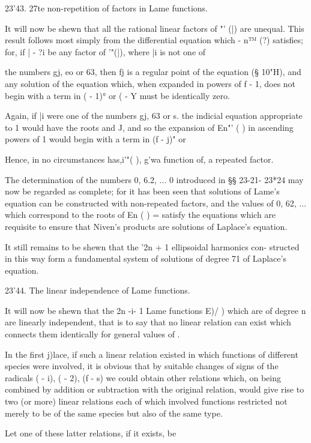 {{{{{{{23'43. 27te non-repetition of factors in Lame functions.

It will now be shewn that all the rational linear factors of "' (|)
are unequal. This result follows most simply from the differential
equation which - n™ (?) satisfies; for, if | - ?i be any factor of
'"(|), where |i is not one of

%
%

the numbers gj, eo or 63, then fj is a regular point of the equation
(§ 10"H), and any solution of the equation which, when expanded in
powers of f - 1, does not begin with a term in ( - 1)° or ( - Y must
be identically zero.

Again, if |i were one of the numbers gj, 63 or s. the indicial
equation appropriate to 1 would have the roots and J, and so the
expansion of En"' ( ) in ascending powers of 1 would begin with a term
in (f - j)" or

Hence, in no circumstances has,i'"( ), g'wa function of, a repeated
factor.

The determination of the numbers 0, 6.2, ... 0 introduced in §§
23-21- 23*24 may now be regarded as complete; for it has been seen
that solutions of Lame's equation can be constructed with non-repeated
factors, and the values of 0, 62, ... which correspond to the roots
of En ( ) = satisfy the equations which are requisite to ensure that
Niven's products are solutions of Laplace's equation.

It still remains to be shewn that the '2n + 1 ellipsoidal harmonics
con- structed in this way form a fundamental system of solutions of
degree 71 of Laplace's equation.

23'44. The linear independence of Lame functions.

It will now be shewn that the 2n -i- 1 Lame functions E)/ ) which are
of degree n are linearly independent, that is to say that no linear
relation can exist which connects them identically for general values
of .

In the first j)lace, if such a linear relation existed in which
functions of different species were involved, it is obvious that by
suitable changes of signs of the radicals \/( - i), \/( - 2), \/(f -
s) we could obtain other relations which, on being combined by
addition or subtraction with the original relation, would give rise to
two (or more) linear relations each of which involved functions
restricted not merely to be of the same species but also of the same
type.

Let one of these latter relations, if it exists, be

}}}}}}}
